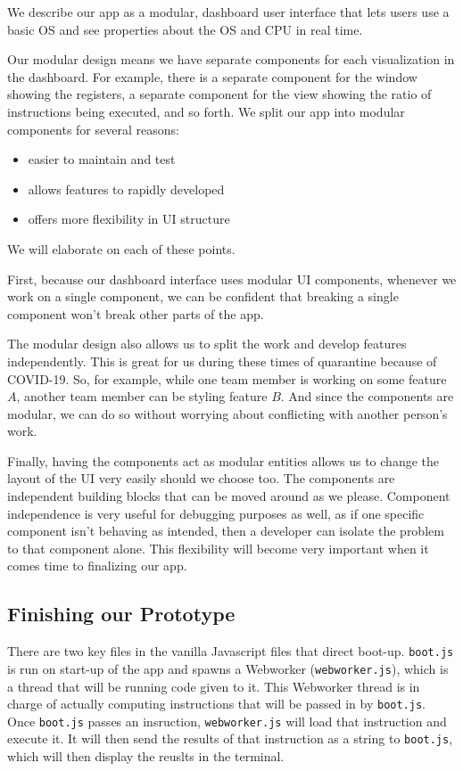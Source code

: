 We describe our app as a modular, dashboard user interface that lets users use a
basic OS and see properties about the OS and CPU in real time.

Our modular design means we have separate components for each visualization in the dashboard.
For example, there is a separate component for the window showing the registers, a separate
component for the view showing the ratio of instructions being executed, and so forth.
\pagebreak
We split our app into modular components for several reasons:

\begin{itemize}
  \item easier to maintain and test
  \item allows features to rapidly developed
  \item offers more flexibility in UI structure
\end{itemize}

We will elaborate on each of these points.

First, because our dashboard interface uses modular UI components, whenever we work on a single
component, we can be confident that breaking a single component won't break other parts of the app.

The modular design also allows us to split the work and develop features independently. This is great for
us during these times of quarantine because of COVID-19. So, for example, while one team member is working on some feature
$A$, another team member can be styling feature $B$. And since the components are modular, we can do so without
worrying about conflicting with another person's work.

Finally, having the components act as modular entities allows us to change the layout of the UI very easily should
we choose too. The components are independent building blocks that can be moved around as we please.
Component independence is very useful for debugging purposes as well, as if one specific component isn't behaving
as intended, then a developer can isolate the problem to that component alone. This
flexibility will become very important when it comes time to finalizing our app.

\subsection*{Finishing our Prototype}

There are two key files in the vanilla Javascript files that direct boot-up. \texttt{boot.js} is run on start-up
of the app and spawns a Webworker (\texttt{webworker.js}), which is a thread that will be running code given to it. This Webworker
thread is in charge of actually computing instructions that will be passed in by \texttt{boot.js}. Once \texttt{boot.js}
passes an insruction, \texttt{webworker.js} will load that instruction and execute it. It will then send the results of that
instruction as a string to \texttt{boot.js}, which will then display the reuslts in the terminal.

